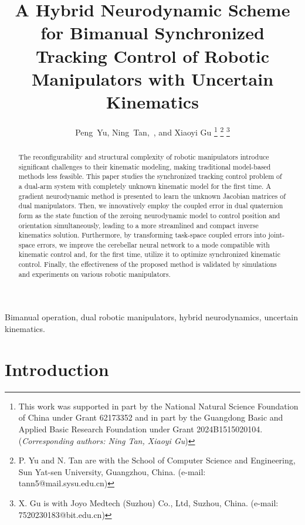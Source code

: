 \documentclass[journal,twoside,web]{ieeecolor}
\begin{document}
\title{A Hybrid Neurodynamic Scheme for Bimanual Synchronized Tracking Control of Robotic Manipulators with Uncertain Kinematics}
\author{Peng~Yu, Ning~Tan,~, and Xiaoyi Gu
\thanks{This work was supported in part by the National Natural Science Foundation of China under Grant 62173352 and in part by the Guangdong Basic and Applied Basic Research Foundation under Grant 2024B1515020104. (\textit{Corresponding authors: Ning Tan, Xiaoyi Gu})}
\thanks{P. Yu and N. Tan are with the School of Computer Science and Engineering, Sun Yat-sen University, Guangzhou, China. (e-mail: tann5@mail.sysu.edu.cn)}
\thanks{X. Gu is with Joyo Medtech (Suzhou) Co., Ltd, Suzhou, China. (e-mail: 7520230183@bit.edu.cn)}}

\maketitle

\begin{abstract}
The reconfigurability and structural complexity of robotic manipulators introduce significant challenges to their kinematic modeling, making traditional model-based methods less feasible. This paper studies the synchronized tracking control problem of a dual-arm system with completely unknown kinematic model for the first time. A gradient neurodynamic method is presented to learn the unknown Jacobian matrices of dual manipulators. Then, we innovatively employ the coupled error in dual quaternion form as the state function of the zeroing neurodynamic model to control position and orientation simultaneously, leading to a more streamlined and compact inverse kinematics solution. Furthermore, by transforming task-space coupled errors into joint-space errors, we improve the cerebellar neural network to a mode compatible with kinematic control and, for the first time, utilize it to optimize synchronized kinematic control. Finally, the effectiveness of the proposed method is validated by simulations and experiments on various robotic manipulators. 
\end{abstract}

\begin{IEEEkeywords}
Bimanual operation, dual robotic manipulators, hybrid neurodynamics, uncertain kinematics.
\end{IEEEkeywords}

\section{Introduction}
\end{document}
